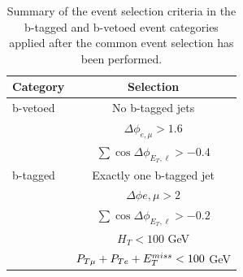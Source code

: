 \begin{table}[!t]
  \begin{center}
    \caption{Summary of the event selection criteria in the b-tagged and b-vetoed event categories applied after the common 
	event selection has been performed.}
	\vspace{2mm}
    \begin{tabular}{p{4cm}c}
      \hline \hline
      Category & Selection \\ [3pt]
      \hline
      b-vetoed &  No b-tagged jets \\	
      & $\Delta\phi_{e,\mu}>1.6$ \\
      & $\sum\cos\Delta\phi_{E_{T},\ell} > -0.4$ \\[5pt]
      \hline
      b-tagged & Exactly one b-tagged  jet \\
      & $\Delta\phi{e,\mu}>2$ \\
      & $\sum\cos\Delta\phi_{E_{T},\ell} > -0.2$ \\
      & $ H_T < 100$ GeV \\
      & $P_{T\mu} + P_{Te} + E_{T}^{miss} < 100$ GeV \\[3pt]
      \hline \hline
    \end{tabular}
    \label{tab:sel}
  \end{center}
\end{table}

